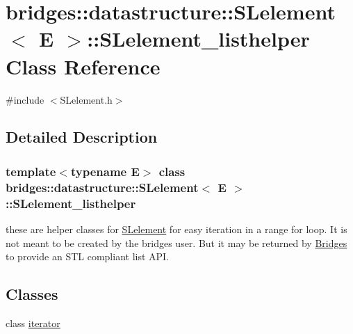 \hypertarget{classbridges_1_1datastructure_1_1_s_lelement_1_1_s_lelement__listhelper}{}\section{bridges\+::datastructure\+::S\+Lelement$<$ E $>$\+::S\+Lelement\+\_\+listhelper Class Reference}
\label{classbridges_1_1datastructure_1_1_s_lelement_1_1_s_lelement__listhelper}


{\ttfamily \#include $<$S\+Lelement.\+h$>$}



\subsection{Detailed Description}
\subsubsection*{template$<$typename E$>$\newline
class bridges\+::datastructure\+::\+S\+Lelement$<$ E $>$\+::\+S\+Lelement\+\_\+listhelper}

these are helper classes for \mbox{\hyperlink{classbridges_1_1datastructure_1_1_s_lelement}{S\+Lelement}} for easy iteration in a range for loop. It is not meant to be created by the bridges user. But it may be returned by \mbox{\hyperlink{classbridges_1_1_bridges}{Bridges}} to provide an S\+TL compliant list A\+PI. \subsection*{Classes}
\begin{DoxyCompactItemize}
\item 
class \mbox{\hyperlink{classbridges_1_1datastructure_1_1_s_lelement_1_1_s_lelement__listhelper_1_1iterator}{iterator}}
\end{DoxyCompactItemize}
